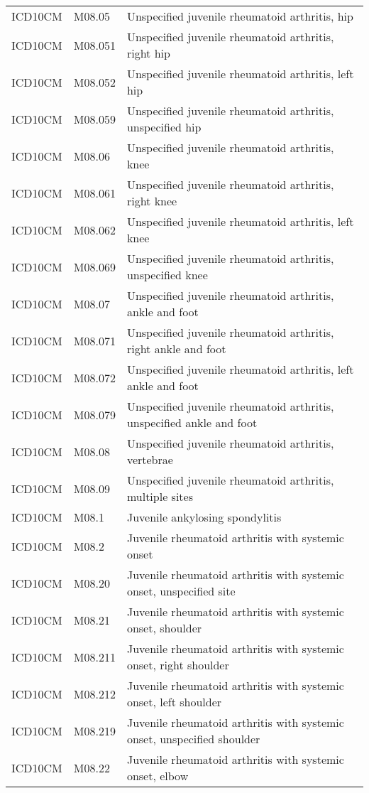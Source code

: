 \begin{table}[ht]
\begin{tabular}{lll}
  ICD10CM & M08.05 & Unspecified juvenile rheumatoid arthritis, hip \\ 
  ICD10CM & M08.051 & Unspecified juvenile rheumatoid arthritis, right hip \\ 
  ICD10CM & M08.052 & Unspecified juvenile rheumatoid arthritis, left hip \\ 
  ICD10CM & M08.059 & Unspecified juvenile rheumatoid arthritis, unspecified hip \\ 
  ICD10CM & M08.06 & Unspecified juvenile rheumatoid arthritis, knee \\ 
  ICD10CM & M08.061 & Unspecified juvenile rheumatoid arthritis, right knee \\ 
  ICD10CM & M08.062 & Unspecified juvenile rheumatoid arthritis, left knee \\ 
  ICD10CM & M08.069 & Unspecified juvenile rheumatoid arthritis, unspecified knee \\ 
  ICD10CM & M08.07 & Unspecified juvenile rheumatoid arthritis, ankle and foot \\ 
  ICD10CM & M08.071 & Unspecified juvenile rheumatoid arthritis, right ankle and foot \\ 
  ICD10CM & M08.072 & Unspecified juvenile rheumatoid arthritis, left ankle and foot \\ 
  ICD10CM & M08.079 & Unspecified juvenile rheumatoid arthritis, unspecified ankle and foot \\ 
  ICD10CM & M08.08 & Unspecified juvenile rheumatoid arthritis, vertebrae \\ 
  ICD10CM & M08.09 & Unspecified juvenile rheumatoid arthritis, multiple sites \\ 
  ICD10CM & M08.1 & Juvenile ankylosing spondylitis \\ 
  ICD10CM & M08.2 & Juvenile rheumatoid arthritis with systemic onset \\ 
  ICD10CM & M08.20 & Juvenile rheumatoid arthritis with systemic onset, unspecified site \\ 
  ICD10CM & M08.21 & Juvenile rheumatoid arthritis with systemic onset, shoulder \\ 
  ICD10CM & M08.211 & Juvenile rheumatoid arthritis with systemic onset, right shoulder \\ 
  ICD10CM & M08.212 & Juvenile rheumatoid arthritis with systemic onset, left shoulder \\ 
  ICD10CM & M08.219 & Juvenile rheumatoid arthritis with systemic onset, unspecified shoulder \\ 
  ICD10CM & M08.22 & Juvenile rheumatoid arthritis with systemic onset, elbow \\ 

\end{tabular}
\end{table}
